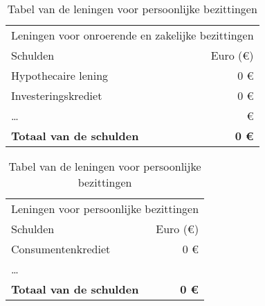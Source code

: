 \begin{table}[ht]
	\begin{minipage}[b]{0.45\linewidth}\centering
		\begin{tabular}{@{}lr@{}}
			\toprule
			\multicolumn{2}{c}{Leningen voor onroerende en zakelijke bezittingen} \\
			\cmidrule(r){1-2}
			Schulden   &                      Euro (\euro{}) \\ \midrule
			Hypothecaire lening             &                           0 \euro{} \\
			Investeringskrediet             &                         0 \euro{} \\
			\dots                           &                             \euro{} \\ \toprule
			\textbf{Totaal van de schulden} &               \textbf{0 \euro{}} \\ \bottomrule
		\end{tabular}
		\caption{Tabel van de leningen voor onroerende en zakelijke bezittingen}
		\label{tab:tabelleningenvooronroerendeenzakelijkebezittingen}
		
		
	\end{minipage}
	\hspace{2cm}
	\begin{minipage}[b]{0.45\linewidth}
		\centering
		\begin{tabular}{@{}lr@{}}
			\toprule
			\multicolumn{2}{c}{Leningen voor persoonlijke bezittingen} \\
			\cmidrule(r){1-2}
			Schulden   &           Euro (\euro{}) \\ \midrule
			Consumentenkrediet              &                0 \euro{} \\
			\dots                           &  \\ \toprule
			\textbf{Totaal van de schulden} &       \textbf{0 \euro{}} \\ \bottomrule
		\end{tabular}
		\caption{Tabel van de leningen voor persoonlijke bezittingen}
		\label{tab:tabelleningenvoorpersoonlijkebezittingen}
	\end{minipage}
\end{table}

